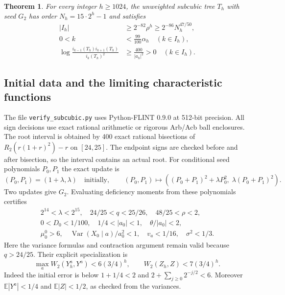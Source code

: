 \documentclass[11pt]{article}
\newtheorem{theorem}{Theorem}
\newcommand{\E}{\mathbb E}
\newcommand{\Var}{\operatorname{Var}}
\begin{document}
\begin{theorem}\label{thm:finite}
For every integer $h\ge1024$, the unweighted subcubic tree $T_h$
with seed $G_2$ has order $N_h=15\cdot2^h-1$ and satisfies
\begin{align}
 |I_h|&\ge2^{-82}\rho^h\ge2^{-86}N_h^{47/50},\label{eq:finite-run}\\
 0<k&<\tfrac{99}{100}\alpha_h\quad(k\in I_h),\label{eq:finite-bulk}\\
 \log\frac{i_{k-1}(T_h)i_{k+1}(T_h)}{i_k(T_h)^2}
 &\ge\frac{400}{|a_h|^2}>0\quad(k\in I_h).\label{eq:finite-curv}
\end{align}
\end{theorem}

\subsection{Initial data and the limiting characteristic functions}
The file \texttt{verify\_subcubic.py} uses Python-FLINT 0.9.0 at 512-bit
precision. All sign decisions use exact rational arithmetic or rigorous
Arb/Acb ball enclosures.
The root interval is obtained by 400 exact rational bisections of
$R_2(r(1+r)^2)-r$ on $[24,25]$. The endpoint signs are checked before
and after bisection, so the interval contains an actual root.
For conditional seed polynomials $P_0,P_1$ the exact update is
\[
 (P_0,P_1)=(1+\lambda,\lambda)\quad\text{initially},\qquad
 (P_0,P_1)\longmapsto
 ((P_0+P_1)^2+\lambda P_0^2,\;\lambda(P_0+P_1)^2).
\]
Two updates give $G_2$. Evaluating deficiency moments from these
polynomials certifies
\begin{gather}\label{eq:initial-numeric}
 2^{14}<\lambda<2^{15},\quad
 24/25<q<25/26,\quad48/25<\rho<2,\nonumber\\
 0<D_0<1/100,\quad1/4<|a_0|<1,\quad\theta/|a_0|<2,\nonumber\\
 \mu_0^0>6,\quad
 \Var(X_0\mid a)/a_0^2<1,\quad v_a<1/16,\quad\sigma^2<1/3.
\end{gather}
Here the variance formulas and contraction argument remain valid because
$q>24/25$. Their explicit specialization is
\begin{equation}\label{eq:finite-w2}
 \max_a W_2(Y_h^a,Y^a)<6(3/4)^h,\qquad
 W_2(Z_h,Z)<7(3/4)^h.
\end{equation}
Indeed the initial error is below $1+1/4<2$ and
$2+\sum_{j\ge0}2^{-j/2}<6$.
Moreover $\E|Y^a|<1/4$ and $\E|Z|<1/2$, as checked from the variances.
\end{document}
